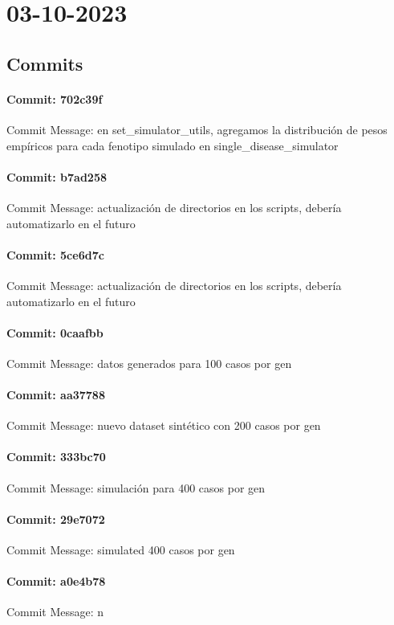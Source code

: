 \documentclass{article}
\begin{document}
\section{03-10-2023}
\subsection{Commits}
\paragraph{Commit: 702c39f}
Commit Message: en set_simulator_utils, agregamos la distribución de pesos empíricos para cada fenotipo simulado en single_disease_simulator

\paragraph{Commit: b7ad258}
Commit Message: actualización de directorios en los scripts, debería automatizarlo en el futuro

\paragraph{Commit: 5ce6d7c}
Commit Message: actualización de directorios en los scripts, debería automatizarlo en el futuro

\paragraph{Commit: 0caafbb}
Commit Message: datos generados para 100 casos por gen

\paragraph{Commit: aa37788}
Commit Message: nuevo dataset sintético con 200 casos por gen

\paragraph{Commit: 333bc70}
Commit Message: simulación para 400 casos por gen

\paragraph{Commit: 29e7072}
Commit Message: simulated 400 casos por gen

\paragraph{Commit: a0e4b78}
Commit Message: n
\end{document}
